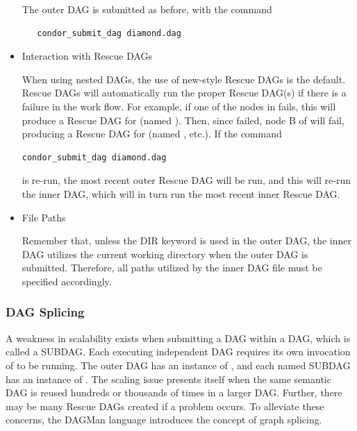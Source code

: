 \begin{itemize}
The outer DAG is submitted as before, with the command
\begin{verbatim}
   condor_submit_dag diamond.dag
\end{verbatim}

\item{Interaction with Rescue DAGs}

When using nested DAGs, the use of new-style Rescue DAGs is the default.  
Rescue DAGs will automatically run the proper Rescue DAG(s) if
there is a failure in the work flow.  For example, if one of the
nodes in  fails, this will produce a Rescue
DAG for  (named ).
Then,
since  failed, node B of  will fail,
producing a Rescue DAG for 
(named , etc.).  
If the command
\begin{verbatim}
condor_submit_dag diamond.dag
\end{verbatim}
is re-run, the most recent outer Rescue
DAG will be run, and this will re-run the inner DAG, which will
in turn run the most recent inner Rescue DAG.  

\item{File Paths}

Remember that, unless the DIR keyword is used in the outer DAG,
the inner DAG utilizes the current working directory when the outer DAG
is submitted.
Therefore, all paths utilized by the inner DAG file
must be specified accordingly.

\end{itemize}

\subsubsection{\label{sec:DAGSplicing}DAG Splicing}

A weakness in scalability exists when submitting a DAG within a DAG,
which is called a SUBDAG.
Each executing independent DAG requires its own invocation of
 to be running.
The outer DAG has an instance of , 
and each named SUBDAG has an instance of . 
The scaling issue presents itself when
the same semantic DAG is reused hundreds or thousands of times
in a larger DAG.
Further, there may be many Rescue DAGs created if a problem occurs.
To alleviate these concerns, the DAGMan language introduces
the concept of graph splicing.

